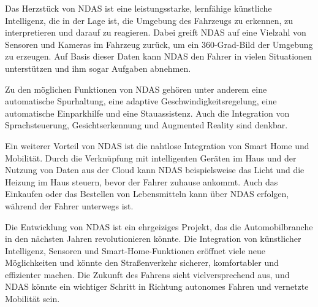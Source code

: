 Das Herzstück von NDAS ist eine leistungsstarke, lernfähige künstliche Intelligenz, die in der Lage ist, die Umgebung des Fahrzeugs zu erkennen, zu interpretieren und darauf zu reagieren. Dabei greift NDAS auf eine Vielzahl von Sensoren und Kameras im Fahrzeug zurück, um ein 360-Grad-Bild der Umgebung zu erzeugen. Auf Basis dieser Daten kann NDAS den Fahrer in vielen Situationen unterstützen und ihm sogar Aufgaben abnehmen.

Zu den möglichen Funktionen von NDAS gehören unter anderem eine automatische Spurhaltung, eine adaptive Geschwindigkeitsregelung, eine automatische Einparkhilfe und eine Stauassistenz. Auch die Integration von Sprachsteuerung, Gesichtserkennung und Augmented Reality sind denkbar.

Ein weiterer Vorteil von NDAS ist die nahtlose Integration von Smart Home und Mobilität. Durch die Verknüpfung mit intelligenten Geräten im Haus und der Nutzung von Daten aus der Cloud kann NDAS beispielsweise das Licht und die Heizung im Haus steuern, bevor der Fahrer zuhause ankommt. Auch das Einkaufen oder das Bestellen von Lebensmitteln kann über NDAS erfolgen, während der Fahrer unterwegs ist.

Die Entwicklung von NDAS ist ein ehrgeiziges Projekt, das die Automobilbranche in den nächsten Jahren revolutionieren könnte. Die Integration von künstlicher Intelligenz, Sensoren und Smart-Home-Funktionen eröffnet viele neue Möglichkeiten und könnte den Straßenverkehr sicherer, komfortabler und effizienter machen. Die Zukunft des Fahrens sieht vielversprechend aus, und NDAS könnte ein wichtiger Schritt in Richtung autonomes Fahren und vernetzte Mobilität sein.